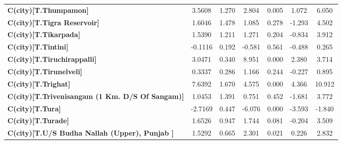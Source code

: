 \begin{center}
\begin{tabular}{lcccccc}
\textbf{C(city)[T.Thumpamon]}                                                                       &       3.5608  &        1.270     &     2.804  &         0.005        &        1.072    &        6.050     \\
\textbf{C(city)[T.Tigra Reservoir]}                                                                 &       1.6046  &        1.478     &     1.085  &         0.278        &       -1.293    &        4.502     \\
\textbf{C(city)[T.Tikarpada]}                                                                       &       1.5390  &        1.211     &     1.271  &         0.204        &       -0.834    &        3.912     \\
\textbf{C(city)[T.Tintini]}                                                                         &      -0.1116  &        0.192     &    -0.581  &         0.561        &       -0.488    &        0.265     \\
\textbf{C(city)[T.Tiruchirappalli]}                                                                 &       3.0471  &        0.340     &     8.951  &         0.000        &        2.380    &        3.714     \\
\textbf{C(city)[T.Tirunelveli]}                                                                     &       0.3337  &        0.286     &     1.166  &         0.244        &       -0.227    &        0.895     \\
\textbf{C(city)[T.Trighat]}                                                                         &       7.6392  &        1.670     &     4.575  &         0.000        &        4.366    &       10.912     \\
\textbf{C(city)[T.Trivenisangam (1 Km. D/S Of Sangam)]}                                             &       1.0453  &        1.391     &     0.751  &         0.452        &       -1.681    &        3.772     \\
\textbf{C(city)[T.Tura]}                                                                            &      -2.7169  &        0.447     &    -6.076  &         0.000        &       -3.593    &       -1.840     \\
\textbf{C(city)[T.Turade]}                                                                          &       1.6526  &        0.947     &     1.744  &         0.081        &       -0.204    &        3.509     \\
\textbf{C(city)[T.U/S Budha Nallah (Upper), Punjab      ]}                                          &       1.5292  &        0.665     &     2.301  &         0.021        &        0.226    &        2.832     \\

\end{tabular}
\end{center}
